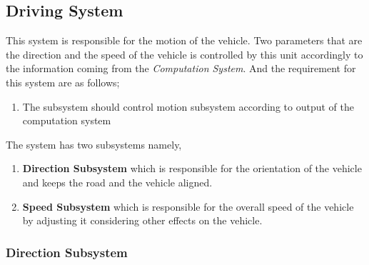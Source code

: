 \documentclass[a4paper,12pt]{article}
\begin{document}
	
	
	\subsection{Driving System}
	
	This system is responsible for the motion of the vehicle. Two parameters that are the direction and the speed of the vehicle is controlled by this unit accordingly to the information coming from the \textit{Computation System}. And the requirement for this system are as follows;
		
		\begin{enumerate}
			\item The subsystem should control motion subsystem according to output of the computation system			
		\end{enumerate}
		
		
		The system has two subsystems namely,
		
			\begin{enumerate}
				\item \textbf{Direction Subsystem} which is responsible for the orientation of the vehicle and keeps the road and the vehicle aligned.
				\item \textbf{Speed Subsystem} which is responsible for the overall speed of the vehicle by adjusting it considering other effects on the vehicle.
			\end{enumerate}
			
	\subsubsection{Direction Subsystem}
		
\end{document}
